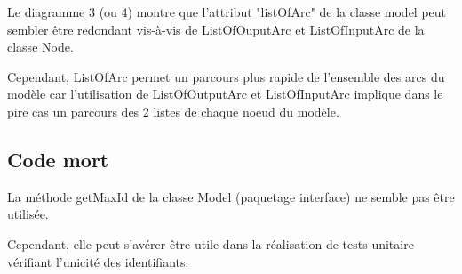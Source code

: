 \documentclass{article}
\begin{document}
Le diagramme 3 (ou 4) montre que l'attribut "listOfArc" de la classe model peut sembler \^etre redondant vis-\`a-vis de ListOfOuputArc et ListOfInputArc de la classe Node.

Cependant, ListOfArc permet un parcours plus rapide de l'ensemble des arcs du mod\`ele car l'utilisation de ListOfOutputArc et ListOfInputArc implique dans le pire cas un parcours des 2 listes de chaque noeud du mod\`ele.

\subsection{Code mort}

La m\'ethode getMaxId de la classe Model (paquetage interface) ne semble pas \^etre utilis\'ee.

Cependant, elle peut s'av\'erer \^etre utile dans la r\'ealisation de tests unitaire v\'erifiant l'unicit\'e des identifiants.
\end{document}
